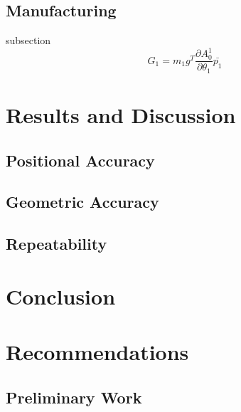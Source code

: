 \documentclass[conference]{IEEEtran}
\begin{document}
	\subsection{Manufacturing}
		subsection
			\begin{equation}
			G_1 = m_1 g^T \frac{\partial A_0^1}{\partial \theta_1}\bar{p_1}
			\end{equation}
			
		
\section{Results and Discussion}
\label{results_section}
	\subsection{Positional Accuracy}
	\subsection{Geometric Accuracy}
	\subsection{Repeatability}
	
\section{Conclusion}
\label{conclusion_section}

\section{Recommendations}
\label{recommendations_section}

\newpage
%

\newpage
\begin{appendices}
	\section{Preliminary Work}
	

\end{appendices}
\end{document}

